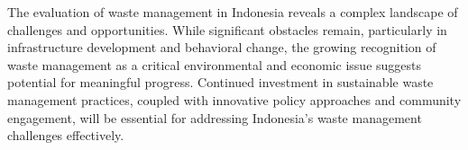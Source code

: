 The evaluation of waste management in Indonesia reveals a complex landscape of challenges and opportunities. While significant obstacles remain, particularly in infrastructure development and behavioral change, the growing recognition of waste management as a critical environmental and economic issue suggests potential for meaningful progress. Continued investment in sustainable waste management practices, coupled with innovative policy approaches and community engagement, will be essential for addressing Indonesia's waste management challenges effectively.